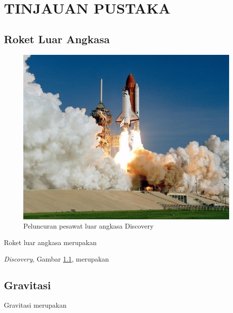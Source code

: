 \chapter{TINJAUAN PUSTAKA}


\section{Roket Luar Angkasa}

\begin{figure} [ht] \centering
  \includegraphics[scale=0.3]{gambar/space-shuttle.jpg}
  \caption{Peluncuran pesawat luar angkasa Discovery \citep{DiscoverySpaceShuttle}}
  \label{fig:SpaceShuttle}
\end{figure}

Roket luar angkasa merupakan \lipsum[16][1-10]

\emph{Discovery}, Gambar \ref{fig:SpaceShuttle}, merupakan \lipsum[17][1-9]

\section{Gravitasi}

Gravitasi merupakan \lipsum[18][1-10]

